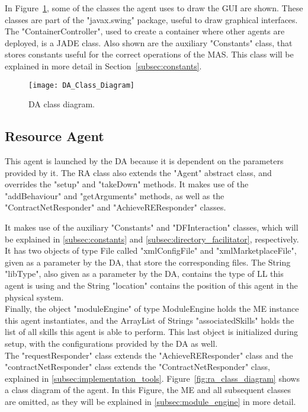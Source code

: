 In Figure~\ref{fig:da_class_diagram}, some of the classes the agent uses to draw the \acrshort{GUI} are shown. These classes are part of the "javax.swing" package, useful to draw graphical interfaces. The "ContainerController", used to create a container where other agents are deployed, is a \acrshort{JADE} class. Also shown are the auxiliary "Constants" class, that stores constants useful for the correct operations of the \acrshort{MAS}. This class will be explained in more detail in Section~\ref{subsec:constants}.\\

\begin{figure}[h!]
	\centering
	\texttt{[image: DA\_Class\_Diagram]}
	\caption{\acrlong{DA} class diagram.}
	\label{fig:da_class_diagram}
\end{figure}

\subsection{Resource Agent}
\label{subsec:resource_agent}

This agent is launched by the \acrshort{DA} because it is dependent on the parameters provided by it. The \acrlong{RA} class also extends the "Agent" abstract class, and overrides the "setup" and "takeDown" methods. It makes use of the "addBehaviour" and "getArguments" methods, as well as the "ContractNetResponder" and "AchieveREResponder" classes.

It makes use of the auxiliary "Constants" and "DFInteraction" classes, which will be explained in \ref{subsec:constants} and \ref{subsec:directory_facilitator}, respectively. It has two objects of type File called "xmlConfigFile" and "xmlMarketplaceFile", given as a parameter by the \acrshort{DA}, that store the corresponding files. The String "libType", also given as a parameter by the \acrshort{DA}, contains the type of \acrshort{LL} this agent is using and the String "location" contains the position of this agent in the physical system.\\

Finally, the object "moduleEngine" of type ModuleEngine holds the \acrshort{ME} instance this agent instantiates, and the ArrayList of Strings "associatedSkills" holds the list of all skills this agent is able to perform. This last object is initialized during setup, with the configurations provided by the \acrshort{DA} as well.\\

The "requestResponder" class extends the "AchieveREResponder" class and the "contractNetResponder" class extends the "ContractNetResponder" class, explained in \ref{subsec:implementation_tools}. Figure~\ref{fig:ra_class_diagram} shows a class diagram of the agent. In this Figure, the \acrlong{ME} and all subsequent classes are omitted, as they will be explained in \ref{subsec:module_engine} in more detail.\\

